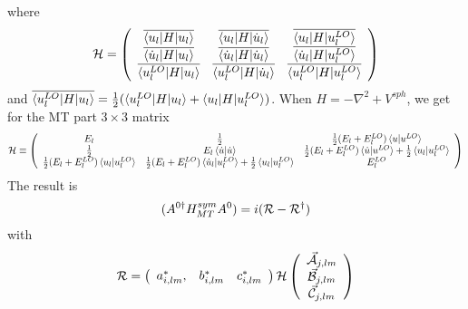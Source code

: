 \documentclass[aps,prb,floatfix,epsfig,singlecolumn,showpacs,preprintnumbers]{revtex4}
\newcommand{\cR}{{\cal R}}
\newcommand{\cH}{{\cal H}}
\newcommand{\vcA}{\vec{\cal A}}
\newcommand{\vcB}{\vec{\cal B}}
\newcommand{\vcC}{\vec{\cal C}}
\begin{document}
where
\begin{eqnarray}
\cH=\left(
\begin{array}{ccc}
\overline{\braket{u_l|H|u_l}} & \overline{\braket{u_l|H|\dot{u}_l}} & \overline{\braket{u_l|H|u^{LO}_l}} \\
\overline{\braket{\dot{u}_l|H|u_l}} & \overline{\braket{\dot{u}_l|H|\dot{u}_l}} & \overline{\braket{\dot{u}_l|H|u^{LO}_l}} \\
\overline{\braket{u^{LO}_l|H|u_l}} & \overline{\braket{u^{LO}_l|H|\dot{u}_l}} & \overline{\braket{u^{LO}_l|H|u^{LO}_l}} 
\end{array}
\right)
\end{eqnarray} 
and
$\overline{\braket{u^{LO}_l|H|u_l}} =\frac{1}{2}(\braket{u^{LO}_l|H|u_l} +\braket{u_l|H|u^{LO}_l})$.
When $H=-\nabla^2+V^{sph}$, we get for the MT part
$3\times 3$ matrix
\begin{eqnarray}
\cH \equiv \left(
\begin{array}{ccc}
E_l & \frac{1}{2} & \frac{1}{2}(E_l+E^{LO}_l) \braket{u|u^{LO}} \\
\frac{1}{2} & E_l \braket{\dot{u}|\dot{u}} & \frac{1}{2}(E_l+E^{LO}_l) \braket{\dot{u}|u^{LO}} +\frac{1}{2}\braket{u_l|u_l^{LO}}\\
\frac{1}{2}(E_l+E^{LO}_l) \braket{u_l|u^{LO}_l}&  \frac{1}{2}(E_l+E^{LO}_l) \braket{\dot{u}_l|u^{LO}_l}+\frac{1}{2}\braket{u_l|u_l^{LO}}& E^{LO}_l
\end{array}
\right)
\end{eqnarray}
The result is
\begin{eqnarray}
(A^{0\dagger} H_{MT}^{sym} A^0) = i (\cR-\cR^\dagger)
\end{eqnarray}
with
\begin{eqnarray}
\cR = 
\left(
\begin{array}{ccc}
a_{i,lm}^*, & b_{i,lm}^* & c^*_{i,lm}
\end{array}
\right)
\cH
\left(
\begin{array}{c}
\vcA_{j,lm}\\
\vcB_{j,lm}\\ 
\vcC_{j,lm}
\end{array}
\right)
\end{eqnarray}
\end{document}

